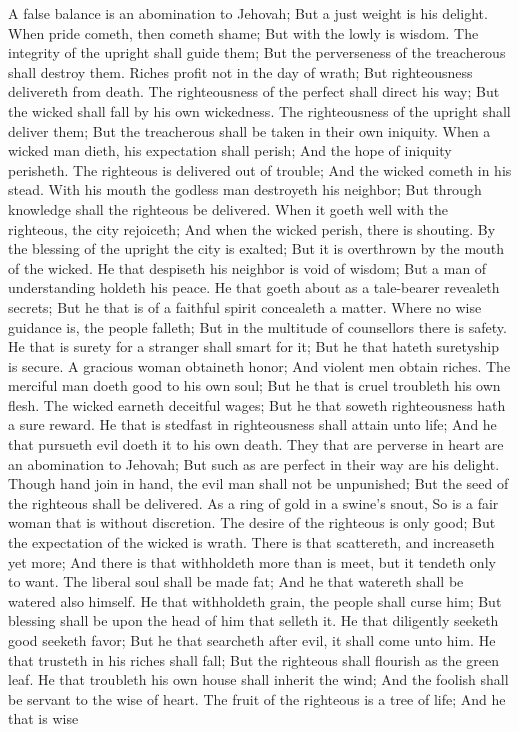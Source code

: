 A false balance is an abomination to Jehovah; But a just weight is his delight.  When pride cometh, then cometh shame; But with the lowly is wisdom.  The integrity of the upright shall guide them; But the perverseness of the treacherous shall destroy them.  Riches profit not in the day of wrath; But righteousness delivereth from death.  The righteousness of the perfect shall direct his way; But the wicked shall fall by his own wickedness.  The righteousness of the upright shall deliver them; But the treacherous shall be taken in their own iniquity.  When a wicked man dieth, his expectation shall perish; And the hope of iniquity perisheth.  The righteous is delivered out of trouble; And the wicked cometh in his stead.  With his mouth the godless man destroyeth his neighbor; But through knowledge shall the righteous be delivered.  When it goeth well with the righteous, the city rejoiceth; And when the wicked perish, there is shouting.  By the blessing of the upright the city is exalted; But it is overthrown by the mouth of the wicked.  He that despiseth his neighbor is void of wisdom; But a man of understanding holdeth his peace.  He that goeth about as a tale-bearer revealeth secrets; But he that is of a faithful spirit concealeth a matter.  Where no wise guidance is, the people falleth; But in the multitude of counsellors there is safety.  He that is surety for a stranger shall smart for it; But he that hateth suretyship is secure.  A gracious woman obtaineth honor; And violent men obtain riches.  The merciful man doeth good to his own soul; But he that is cruel troubleth his own flesh.  The wicked earneth deceitful wages; But he that soweth righteousness hath a sure reward.  He that is stedfast in righteousness shall attain unto life; And he that pursueth evil doeth it to his own death.  They that are perverse in heart are an abomination to Jehovah; But such as are perfect in their way are his delight.  Though hand join in hand, the evil man shall not be unpunished; But the seed of the righteous shall be delivered.  As a ring of gold in a swine’s snout, So is a fair woman that is without discretion.  The desire of the righteous is only good; But the expectation of the wicked is wrath.  There is that scattereth, and increaseth yet more; And there is that withholdeth more than is meet, but it tendeth only to want.  The liberal soul shall be made fat; And he that watereth shall be watered also himself.  He that withholdeth grain, the people shall curse him; But blessing shall be upon the head of him that selleth it.  He that diligently seeketh good seeketh favor; But he that searcheth after evil, it shall come unto him.  He that trusteth in his riches shall fall; But the righteous shall flourish as the green leaf.  He that troubleth his own house shall inherit the wind; And the foolish shall be servant to the wise of heart.  The fruit of the righteous is a tree of life; And he that is wise 
